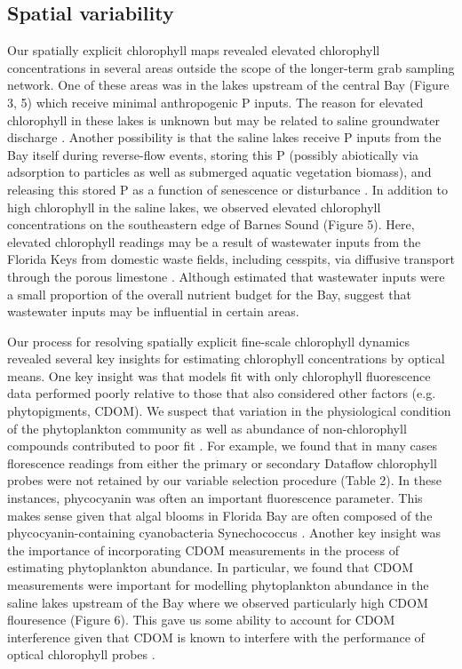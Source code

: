 \subsection{Spatial variability}
\label{spatialvariability}

Our spatially explicit chlorophyll maps revealed elevated chlorophyll concentrations in several areas outside the scope of the longer-term grab sampling network. One of these areas was in the lakes upstream of the central Bay (Figure 3, 5) which receive minimal anthropogenic P inputs. The reason for elevated chlorophyll in these lakes is unknown but may be related to saline groundwater discharge \citep{price2006coastal}. Another possibility is that the saline lakes receive P inputs from the Bay itself during reverse-flow events, storing this P (possibly abiotically via adsorption to particles as well as submerged aquatic vegetation biomass), and releasing this stored P as a function of senescence or disturbance \citep{rudnick1999phosphorus}. In addition to high chlorophyll in the saline lakes, we observed elevated chlorophyll concentrations on the southeastern edge of Barnes Sound (Figure 5). Here, elevated chlorophyll readings may be a result of wastewater inputs from the Florida Keys from domestic waste fields, including cesspits, via diffusive transport through the porous limestone \citep{rudnick1999phosphorus}. Although \citet{rudnick1999phosphorus} estimated that wastewater inputs were a small proportion of the overall nutrient budget for the Bay, \citet{szmant1996water} suggest that wastewater inputs may be influential in certain areas. 

Our process for resolving spatially explicit fine-scale chlorophyll dynamics revealed several key insights for estimating chlorophyll concentrations by optical means. One key insight was that models fit with only chlorophyll fluorescence data performed poorly relative to those that also considered other factors (e.g. phytopigments, CDOM). We suspect that variation in the physiological condition of the phytoplankton community as well as abundance of non-chlorophyll compounds contributed to poor fit \citep{proctor2010new}. For example, we found that in many cases florescence readings from either the primary or secondary Dataflow chlorophyll probes were not retained by our variable selection procedure (Table 2). In these instances, phycocyanin was often an important fluorescence parameter. This makes sense given that algal blooms in Florida Bay are often composed of the phycocyanin-containing cyanobacteria Synechococcus \citep{phlips_blooms_1999}. Another key insight was the importance of incorporating CDOM measurements in the process of estimating phytoplankton abundance. In particular, we found that CDOM measurements were important for modelling phytoplankton abundance in the saline lakes upstream of the Bay where we observed particularly high CDOM flouresence (Figure 6). This gave us some ability to account for CDOM interference given that CDOM is known to interfere with the performance of optical chlorophyll probes \citep{proctor2010new}.

